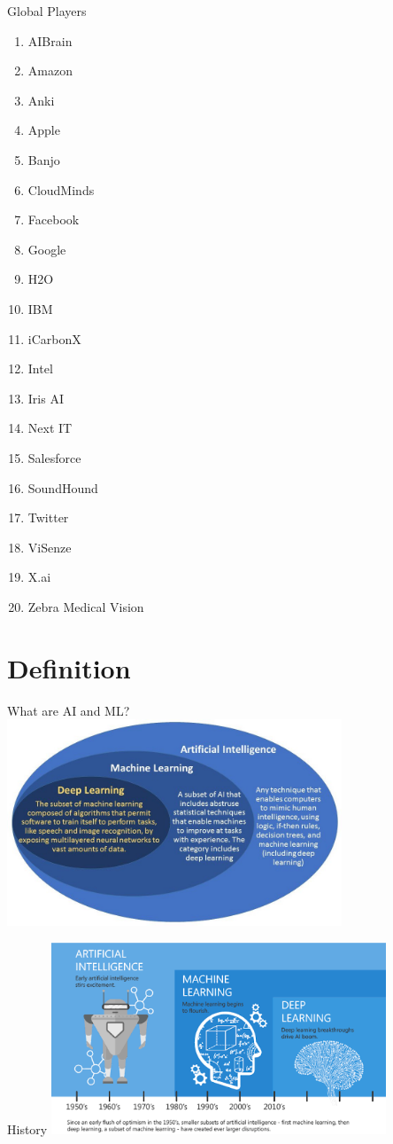 \documentclass{beamer}
\begin{document}
\begin{frame}{Global Players}
 \begin{multicols}{2}
 \begin{enumerate}
  \item AIBrain
  \item Amazon
  \item Anki
  \item Apple
  \item Banjo
  \item CloudMinds
  \item Facebook
  \item Google
  \item H2O
  \item IBM
  \item iCarbonX
  \item Intel
  \item Iris AI
  \item Next IT
  \item Salesforce
  \item SoundHound
  \item Twitter
  \item ViSenze
  \item X.ai
  \item Zebra Medical Vision
  \end{enumerate}
  \end{multicols}
\end{frame}

\section{Definition}
\begin{frame}{What are AI and ML?}
\centering
\includegraphics[width=10cm]{figures/ai-ml-dl}
\end{frame}

\begin{frame}{History}
\centering
\includegraphics[width=10cm]{figures/history}
\end{frame}
\end{document}
